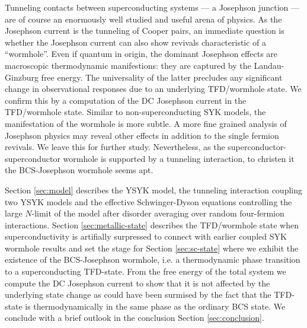 Tunneling contacts between superconducting systems --- a Josephson junction --- are of course an enormously well studied and useful arena of physics. As the Josephson current is the tunneling of Cooper pairs, an immediate question is whether the %
Josephson current can also show revivals characteristic of a ``wormhole''. 
Even if quantum in origin, the dominant Josephson effects are macroscopic thermodynamic manifestions: they are captured by the Landau-Ginzburg free energy. The universality of the latter precludes any significant change in observational responses due to an underlying TFD/wormhole state. We confirm this by a computation of the DC Josephson current in the TFD/wormhole state. Similar to non-superconducting SYK models, the manifestation of the wormhole is more subtle. A more fine grained analysis of Josephson physics may reveal other effects in addition to the single fermion revivals. We leave this for further study. 
Nevertheless, as the superconductor-superconductor wormhole is supported by a tunneling interaction, to christen it the BCS-Josephson wormhole seems apt.



Section \ref{sec:model} describes the YSYK model, the tunneling interaction coupling two YSYK models and the effective Schwinger-Dyson equations controlling the large $N$-limit of the model after disorder averaging over random four-fermion interactions. Section \ref{sec:metallic-state} describes the TFD/wormhole state when superconductivity is artifially surpressed to connect with earlier coupled SYK wormhole results and set the stage for Section \ref{sec:sc-state} where we exhibit the existence of the BCS-Josephson wormhole, i.e. a thermodynamic phase transition to a superconducting TFD-state. From the free energy of the total system we compute the DC Josephson current to show that it is not affected by the underlying state change as could have been surmised by the fact that the TFD-state is thermodynamically in the same phase as the ordinary BCS state. We conclude with a brief outlook in the conclusion Section \ref{sec:conclusion}.




